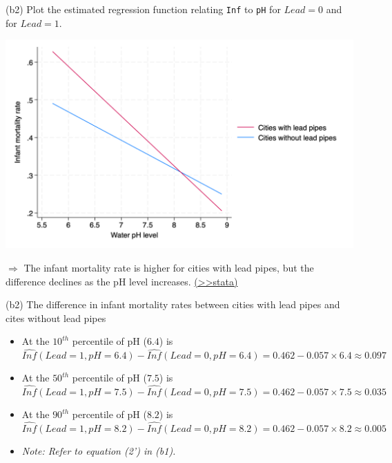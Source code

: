\documentclass[
  10pt,
  ignorenonframetext,
]{beamer}
\providecommand{\tightlist}{%
  \setlength{\itemsep}{0pt}\setlength{\parskip}{0pt}}
\begin{document}
\begin{frame}{(b2) Plot the estimated regression function relating
\texttt{Inf} to \texttt{pH} for \(Lead = 0\) and for \(Lead = 1\).}
\protect\hypertarget{b2-plot-the-estimated-regression-function-relating-inf-to-ph-for-lead-0-and-for-lead-1.}{}
\begin{center}\includegraphics[width=0.8\linewidth]{pictures/ex1-Lineplot} \end{center}

\(\Rightarrow\) The infant mortality rate is higher for cities with lead
pipes, but the difference declines as the pH level increases.
\footnotesize \protect\hyperlink{ex1-res3-plotRegLine}{(\textgreater\textgreater stata)}
\normalsize
\end{frame}

\begin{frame}{(b2) The difference in infant mortality rates between
cities with lead pipes and cites without lead pipes}
\protect\hypertarget{b2-the-difference-in-infant-mortality-rates-between-cities-with-lead-pipes-and-cites-without-lead-pipes}{}
\normalsize

\begin{itemize}
\tightlist
\item
  At the \(10^{th}\) percentile of pH (\(6.4\)) is \small \[
  \widehat{Inf}(Lead=1,pH=6.4) - \widehat{Inf}(Lead=0,pH=6.4) = 0.462-0.057\times6.4 \approx 0.097
  \] \normalsize
\item
  At the \(50^{th}\) percentile of pH (\(7.5\)) is \small \[
  \widehat{Inf}(Lead=1,pH=7.5) - \widehat{Inf}(Lead=0,pH=7.5) = 0.462-0.057\times7.5 \approx 0.035
  \] \normalsize
\item
  At the \(90^{th}\) percentile of pH (\(8.2\)) is \small \[
  \widehat{Inf}(Lead=1,pH=8.2) - \widehat{Inf}(Lead=0,pH=8.2) = 0.462-0.057\times8.2 \approx  0.005
  \]
\end{itemize}

\footnotesize

\begin{itemize}
\tightlist
\item
  \emph{Note: Refer to equation (2') in (b1).}
\end{itemize}
\end{frame}
\end{document}
